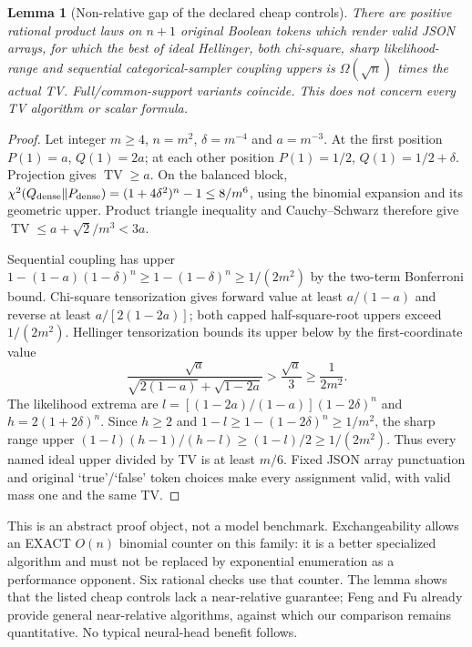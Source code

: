 \documentclass[11pt]{article}
\newtheorem{lemma}{Lemma}
\newcommand{\TV}{\operatorname{TV}}
\begin{document}
\begin{lemma}[Non-relative gap of the declared cheap controls]\label{lem:gap}
There are positive rational product laws on $n+1$ original Boolean tokens
which render valid JSON arrays, for which the best of ideal Hellinger,
both chi-square, sharp likelihood-range and sequential categorical-sampler
coupling uppers is $\Omega(\sqrt n)$ times the actual TV. Full/common-support
variants coincide. This does not concern every TV algorithm or scalar formula.
\end{lemma}
\begin{proof}
Let integer $m\geq4$, $n=m^2$, $\delta=m^{-4}$ and $a=m^{-3}$.
At the first position $P(1)=a$, $Q(1)=2a$; at each other position
$P(1)=1/2$, $Q(1)=1/2+\delta$. Projection gives $\TV\geq a$.
On the balanced block,
$\chi^2(Q_{\rm dense}\Vert P_{\rm dense})=(1+4\delta^2)^n-1
\leq8/m^6$, using the binomial expansion and its geometric upper.
Product triangle inequality and Cauchy--Schwarz therefore give
$\TV\leq a+\sqrt2/m^3<3a$.

Sequential coupling has upper
$1-(1-a)(1-\delta)^n\geq1-(1-\delta)^n\geq1/(2m^2)$
by the two-term Bonferroni bound. Chi-square tensorization gives forward
value at least $a/(1-a)$ and reverse at least $a/[2(1-2a)]$;
both capped half-square-root uppers exceed $1/(2m^2)$.
Hellinger tensorization bounds its upper below by the first-coordinate value
\[
 \frac{\sqrt a}{\sqrt{2(1-a)}+\sqrt{1-2a}}
 >\frac{\sqrt a}{3}\geq\frac{1}{2m^2}.
\]
The likelihood extrema are
$l=[(1-2a)/(1-a)](1-2\delta)^n$ and $h=2(1+2\delta)^n$.
Since $h\geq2$ and $1-l\geq1-(1-2\delta)^n\geq1/m^2$, the sharp
range upper $(1-l)(h-1)/(h-l)\geq(1-l)/2\geq1/(2m^2)$.
Thus every named ideal upper divided by TV is at least $m/6$.
Fixed JSON array punctuation and original `true'/`false' token choices
make every assignment valid, with valid mass one and the same TV.
\end{proof}
This is an abstract proof object, not a model benchmark. Exchangeability
allows an EXACT $O(n)$ binomial counter on this family: it is a better
specialized algorithm and must not be replaced by exponential enumeration
as a performance opponent. Six rational checks use that counter. The lemma
shows that the listed cheap controls lack a near-relative guarantee; Feng
and Fu already provide general near-relative algorithms, against which our
comparison remains quantitative. No typical neural-head benefit follows.
\end{document}
